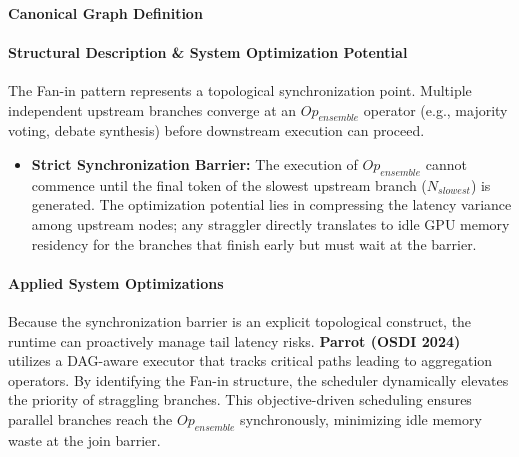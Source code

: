 \paragraph{Canonical Graph Definition}
\begin{center}
\end{center}

\paragraph{Structural Description \& System Optimization Potential}
The Fan-in pattern represents a topological synchronization point. Multiple independent upstream branches converge at an $Op_{ensemble}$ operator (e.g., majority voting, debate synthesis) before downstream execution can proceed.
\begin{itemize}
    \item \textbf{Strict Synchronization Barrier:} The execution of $Op_{ensemble}$ cannot commence until the final token of the slowest upstream branch ($N_{slowest}$) is generated. The optimization potential lies in compressing the latency variance among upstream nodes; any straggler directly translates to idle GPU memory residency for the branches that finish early but must wait at the barrier.
\end{itemize}

\paragraph{Applied System Optimizations}
Because the synchronization barrier is an explicit topological construct, the runtime can proactively manage tail latency risks. \textbf{Parrot (OSDI 2024)}~\citep{lin2024parrot} utilizes a DAG-aware executor that tracks critical paths leading to aggregation operators. By identifying the Fan-in structure, the scheduler dynamically elevates the priority of straggling branches. This objective-driven scheduling ensures parallel branches reach the $Op_{ensemble}$ synchronously, minimizing idle memory waste at the join barrier.


